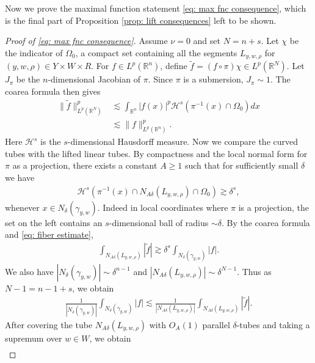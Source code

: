 \documentclass[reqno,11pt]{amsart}
\numberwithin{equation}{section}
\numberwithin{figure}{section}
\def\R{\mathbb{R}}
\renewcommand\geq{\geqslant}
\theoremstyle{plain}
\theoremstyle{definition}
\begin{document}
    Now we prove the maximal function statement \eqref{eq: max fnc consequence}, which is the final part of Proposition \ref{prop: lift consequences} left to be shown.

    \begin{proof}[Proof of \eqref{eq: max fnc consequence}]
    Assume $\nu = 0$ and set $N = n+s$.
    Let $\chi$ be the indicator of $\Omega_0$, a compact set containing all the segments $L_{y,w,\rho}$ for $(y,w,\rho) \in Y \times W \times R$. For $f \in L^p(\R^n)$, define $\tilde f = (f \circ \pi) \chi \in L^p(\R^N)$. Let $J_\pi$ be the $n$-dimensional Jacobian of $\pi$. Since $\pi$ is a submersion, $J_\pi \sim 1$. The coarea formula then gives 
    \begin{align}\label{eq: lp comparison fnc}
        \|\tilde f\|_{L^p(\R^N)}^p &\lesssim \int_{\R^n} |f(x)|^p \mathcal H^s(\pi^{-1}(x) \cap \Omega_0) dx \\
        &\lesssim \|f\|^p_{L^p(\R^n)}.
    \end{align}
    Here $\mathcal H^s$ is the $s$-dimensional Hausdorff measure.
    Now we compare the curved tubes with the lifted linear tubes. By compactness and the local normal form for $\pi$ as a projection, there exists a constant $A \geq 1$ such that for sufficiently small $\delta$ we have 
    \begin{align}\label{eq: fiber estimate}
        \mathcal H^s(\pi^{-1}(x) \cap N_{A\delta}(L_{y,w,\rho}) \cap \Omega_0) \gtrsim \delta^s,
    \end{align}
    whenever $x \in N_\delta(\gamma_{y,w})$.
    Indeed in local coordinates where $\pi$ is a projection, the set on the left contains an $s$-dimensional ball of radius $\sim \delta$. By the coarea formula and \eqref{eq: fiber estimate}, 
    \begin{align}
        \int_{N_{A\delta}(L_{y,w,\rho})} |\tilde f| \gtrsim \delta^s \int_{N_\delta(\gamma_{y,w})} |f|.
    \end{align}
    We also have $|N_{\delta}(\gamma_{y,w})| \sim \delta^{n-1}$ and $|N_{A\delta}(L_{y,w,\rho})| \sim \delta^{N-1}$. Thus as $N-1 = n-1+s$, we obtain 
    \begin{align}
        \frac{1}{|N_\delta(\gamma_{y,w})|} \int_{N_\delta(\gamma_{y,w})} |f| \lesssim \frac{1}{|N_{A\delta}(L_{y,w,\rho})|} \int_{N_{A\delta}(L_{y,w,\rho})} |\tilde f|.
    \end{align}
    After covering the tube $N_{A\delta}(L_{y,w,\rho})$ with $O_A(1)$ parallel $\delta$-tubes and taking a supremum over $w \in W$, we obtain
    \begin{align}\label{eq: ptwise max fnc est}

\end{align}
\end{proof}
\end{document}
